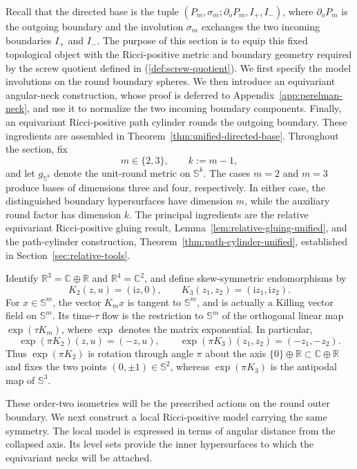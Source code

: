 \documentclass[11pt,reqno]{amsart}
\theoremstyle{definition}
\numberwithin{equation}{section}
\begin{document}
Recall that the directed base is the tuple
$(P_m,\sigma_m;\partial_oP_m,I_+,I_-)$, where $\partial_oP_m$ is the
outgoing boundary and the involution $\sigma_m$ exchanges the two incoming
boundaries $I_+$ and $I_-$.  The purpose of this section is to equip this
fixed topological object with the Ricci-positive metric and boundary
geometry required by the screw quotient defined in (\ref{def:screw-quotient}).
We first specify the model involutions on the round boundary spheres.
We then introduce an equivariant angular-neck construction, whose proof
is deferred to Appendix~\ref{app:perelman-neck}, and use it to normalize
the two incoming boundary components.  Finally, an equivariant
Ricci-positive path cylinder rounds the outgoing boundary.
These ingredients are assembled in
Theorem~\ref{thm:unified-directed-base}.  Throughout the section, fix
\[
m\in\{2,3\},
\qquad
k:=m-1,
\]
and let \(g_{\mathbb S^k}\) denote the unit-round metric on
\(\mathbb S^k\).  The cases \(m=2\) and \(m=3\) produce bases of
dimensions three and four, respectively.  In either case, the
distinguished boundary hypersurfaces have dimension \(m\), while the
auxiliary round factor has dimension \(k\).  The principal ingredients
are the relative equivariant Ricci-positive gluing result,
Lemma~\ref{lem:relative-gluing-unified}, and the path-cylinder
construction, Theorem~\ref{thm:path-cylinder-unified}, established in
Section~\ref{sec:relative-tools}.

Identify $\mathbb R^3=\mathbb C\oplus\mathbb R$ and
$\mathbb R^4=\mathbb C^2$, and define skew-symmetric endomorphisms by
\[
 K_2(z,u)=(\mathrm i z,0),\qquad
 K_3(z_1,z_2)=(\mathrm i z_1,\mathrm i z_2).
\]
For $x\in\mathbb S^m$, the vector $K_mx$ is tangent to $\mathbb S^m$,
and is actually a Killing vector field on $\mathbb S^m$.  Its
time-$\tau$ flow is the restriction to $\mathbb S^m$ of the orthogonal
linear map $\exp(\tau K_m)$, where $\exp$ denotes the matrix
exponential.  In particular,
\begin{equation}
\exp(\pi K_2)(z,u)=(-z,u),\qquad
 \exp(\pi K_3)(z_1,z_2)=(-z_1,-z_2).                            \label{eq:unified-base-3-1}
\end{equation}
Thus $\exp(\pi K_2)$ is rotation through angle $\pi$ about the axis
$\{0\}\oplus\mathbb R\subset\mathbb C\oplus\mathbb R$ and fixes the two points
$(0,\pm1)\in\mathbb S^2$, whereas $\exp(\pi K_3)$ is the antipodal map
of $\mathbb S^3$.



These order-two isometries will be the prescribed actions on the round
outer boundary.  We next construct a local Ricci-positive model carrying
the same symmetry.  The local model is expressed in terms of angular
distance from the collapsed axis.  Its level sets provide the inner
hypersurfaces to which the equivariant necks will be attached.
\end{document}

